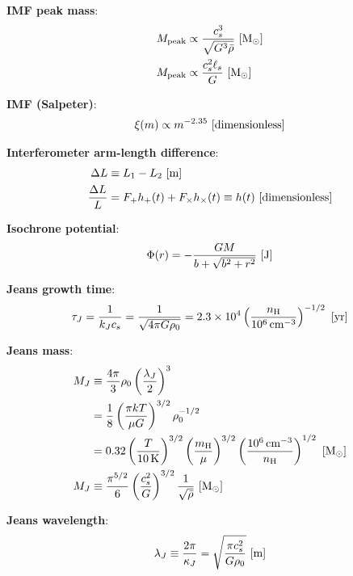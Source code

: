 \documentclass[a4paper,10pt]{article}
\begin{document}
{\noindent}\textbf{IMF peak mass}:
\begin{align*}
    M_\mathrm{peak} &\propto \frac{c_s^3}{\sqrt{G^3\bar{\rho}}}  ~ [{\rm M_\odot}] \\
    M_\mathrm{peak} &\propto \frac{c_s^2\ell_s}{G} ~ [{\rm M_\odot}]
\end{align*}

{\noindent}\textbf{IMF (Salpeter)}:
\begin{align*}
    \xi(m) \propto m^{-2.35} ~ [{\rm dimensionless}]
\end{align*}

{\noindent}\textbf{Interferometer arm-length difference}:
\begin{align*}
    \Delta L &\equiv L_1 - L_2 ~ [{\rm m}] \\
    \frac{\Delta L}{L} &= F_+h_+(t) + F_\times h_\times(t) \equiv h(t) ~ [{\rm dimensionless}]
\end{align*}

{\noindent}\textbf{Isochrone potential}:
\begin{align*}
    \Phi(r) = - \frac{GM}{b + \sqrt{b^2+r^2}} ~ [{\rm J}]
\end{align*}

{\noindent}\textbf{Jeans growth time}:
\begin{align*}
    \tau_J = \frac{1}{k_Jc_s} = \frac{1}{\sqrt{4\pi G\rho_0}} = 2.3\times10^4 \left(\frac{n_{\rm H}}{10^6\,{\rm cm^{-3}}}\right)^{-1/2} ~ [{\rm yr}]
\end{align*}

{\noindent}\textbf{Jeans mass}:
\begin{align*}
    M_J &\equiv \frac{4\pi}{3}\rho_0 \left(\frac{\lambda_J}{2}\right)^3 \\
        &= \frac{1}{8} \left(\frac{\pi kT}{\mu G}\right)^{3/2} \rho_0^{-1/2} \\
        &= 0.32 \left(\frac{T}{10\,{\rm K}}\right)^{3/2} \left(\frac{m_{\rm H}}{\mu}\right)^{3/2} \left(\frac{10^6\,{\rm cm^{-3}}}{n_{\rm H}}\right)^{1/2} ~ [{\rm M_\odot}] \\
    M_J &\equiv \frac{\pi^{5/2}}{6}\left(\frac{c_s^2}{G}\right)^{3/2}\frac{1}{\sqrt{\bar{\rho}}} ~ [{\rm M_\odot}]
\end{align*}

{\noindent}\textbf{Jeans wavelength}:
\begin{align*}
    \lambda_J \equiv \frac{2\pi}{\kappa_J} = \sqrt{\frac{\pi c_s^2}{G\rho_0}} ~ [{\rm m}]
\end{align*}
\end{document}
